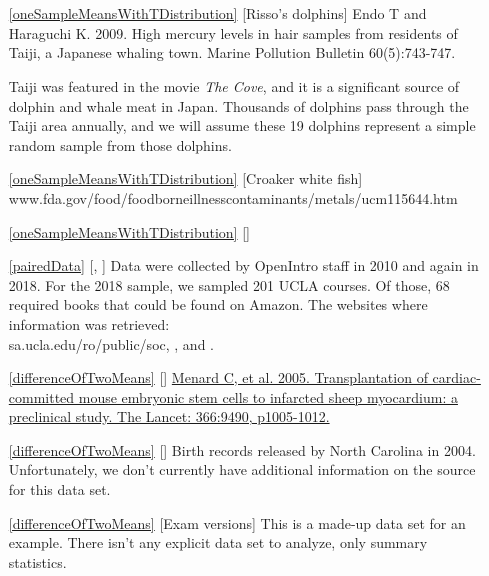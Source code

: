 





\section{}
\label{ch_inference_for_means_data}

\begin{itemize}
\item[\ref{oneSampleMeansWithTDistribution}]
    [Risso's dolphins]
    Endo T and Haraguchi K. 2009.
    High mercury levels in hair samples from residents of Taiji,
    a Japanese whaling town.
    Marine Pollution Bulletin 60(5):743-747.

    Taiji was featured in the movie
    \emph{The Cove}, and it is a significant source of dolphin
    and whale meat in Japan.
    Thousands of dolphins pass through the Taiji area annually,
    and we will assume these 19 dolphins represent a simple
    random sample from those dolphins.
\item[\ref{oneSampleMeansWithTDistribution}]
    [Croaker white fish]
        {www.fda.gov/food/foodborneillnesscontaminants/metals/ucm115644.htm}
\item[\ref{oneSampleMeansWithTDistribution}]
    [\datalink{run17}]

\item[\ref{pairedData}]
    [\datalink{textbooks}, \datalink{ucla\_textbooks\_f18}]
    Data were collected by OpenIntro staff in 2010 and again
    in 2018.
    For the 2018 sample, we sampled 201 UCLA courses.
    Of those, 68 required books that could be
    found on Amazon.
    The websites where information was retrieved: \\
        {sa.ucla.edu/ro/public/soc},
    ,
    and .

\item[\ref{differenceOfTwoMeans}]
    [\datalink{stem\_cells}]
    \href{menard-stem-cells-2005}%
        {Menard C, et al. 2005.
            Transplantation of cardiac-committed mouse embryonic
            stem cells to infarcted sheep myocardium:
            a preclinical study.
            The Lancet: 366:9490, p1005-1012.}
\item[\ref{differenceOfTwoMeans}]
    [\datalink{ncbirths}]
    Birth records released by North Carolina in 2004.
    Unfortunately, we don't currently have additional
    information on the source for this data set.
\item[\ref{differenceOfTwoMeans}]
    [Exam versions]
    This is a made-up data set for an example.
    There isn't any explicit data set to analyze,
    only summary statistics.


\end{itemize}
